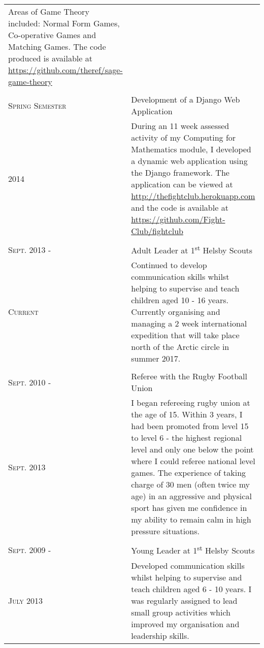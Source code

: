 \documentclass[a4paper]{article}
\begin{document}
\begin{tabularx}{\textwidth}{lX}
{Areas of Game Theory included: Normal Form Games, Co-operative Games and Matching Games. The code produced is available at \url{https://github.com/theref/sage-game-theory}}
\\
\\
\textsc{Spring Semester} & Development of a Django Web Application\\
\textsc{2014} & \footnotesize{During an 11 week assessed activity of my Computing for Mathematics module, I developed a dynamic web application using the Django framework. The application can be viewed at \url{http://thefightclub.herokuapp.com} and the code is available at \url{https://github.com/Fight-Club/fightclub}}
\\
\\
\textsc{Sept. 2013 -} & Adult Leader at 1\textsuperscript{st} Helsby Scouts\\
\textsc{Current} & \footnotesize{Continued to develop communication skills whilst helping to supervise and teach children aged 10 - 16 years.
Currently organising and managing a 2 week international expedition that will take place north of the Arctic circle in summer 2017.}
\\
\\
\textsc{Sept. 2010 -} & Referee with the Rugby Football Union \\
\textsc{Sept. 2013} & \footnotesize{I began refereeing rugby union at the age of 15. Within 3 years, I had been promoted from level 15 to level 6 - the highest regional level and only one below the point where I could referee national level games.
The experience of taking charge of 30 men (often twice my age) in an aggressive and physical sport has given me confidence in my ability to remain calm in high pressure situations.}
\\
\\
\textsc{Sept. 2009 -} & Young Leader at 1\textsuperscript{st} Helsby Scouts\\
\textsc{July 2013} & \footnotesize{Developed communication skills whilst helping to supervise and teach children aged 6 - 10 years.
I was regularly assigned to lead small group activities which improved my organisation and leadership skills.}\\

\end{tabularx}
\end{document}
